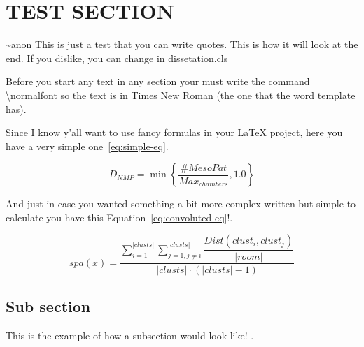 \section{TEST SECTION} \normalfont

\begin{dissQuote}{\~{}anon}
    This is just a test that you can write quotes. This is how it will look at the end. If you dislike, you can change in dissetation.cls
\end{dissQuote}
 

Before you start any text in any section your must write the command \textbackslash{normalfont} so the text is in Times New Roman (the one that the word template has). 


Since I know y'all want to use fancy formulas in your \LaTeX{} project, here you have a very simple one~\cref{eq:simple-eq}.

\begin{equation} \label{eq:simple-eq}
D_{NMP} = \min \left\{ \dfrac{\#MesoPat}{Max_{chambers}}, 1.0 \right\}
\end{equation}

And just in case you wanted something a bit more complex written but simple to calculate you have this Equation~\ref{eq:convoluted-eq}!.

\begin{equation} \label{eq:convoluted-eq}
spa(x)= \dfrac{\sum_{i=1}^{\left | clusts \right |}\sum_{j=1, j\neq i}^{\left | clusts \right |}\dfrac{Dist(clust_{i}, clust_{j})}{\left | room \right |}}{\left | clusts \right | \cdot (\left | clusts \right | - 1)}
\end{equation}

\subsection{Sub section} \normalfont

This is the example of how a subsection would look like! \cite{Kegel2020-surveyPuzzles}.

